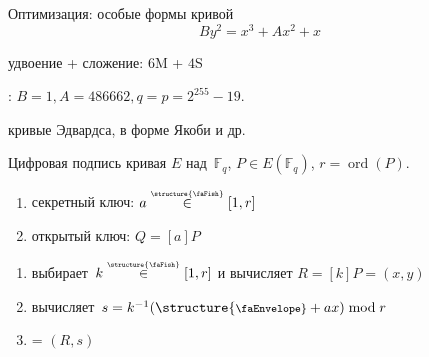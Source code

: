 \documentclass{beamer}
\begin{document}
	\begin{frame}{Оптимизация: особые формы кривой}
		\[
		B y^2 = x^3 + A x^2 + x
		\]
		\begin{center}
			\begin{tcolorbox}[enhanced,hbox,colback=box-blue-color!15,colframe=box-blue-color,title=Сложность,center title]
				\begin{varwidth}{\textwidth}
					удвоение + сложение: $6$M + $4$S
				\end{varwidth}
			\end{tcolorbox}	
		\end{center}
		: $B = 1, A = 486662, q=p=2^{255} - 19$.
		
		\vspace{0.5em}
		
		 кривые Эдвардса, в форме Якоби и др.
	\end{frame}
	
	
	\begin{frame}{Цифровая подпись}
		 кривая $E$ над~$\mathbb{F}_q$, $P \in E(\mathbb{F}_q)$, $r = \operatorname{ord}(P)$.
		
		
		\vspace{1em}
		
		
		\begin{enumerate}
			\item секретный ключ: $a \overset{\text{\tiny\structure{\faFish}}}{\in} [1, r]$
			\item открытый ключ: $Q = [a] P$
		\end{enumerate}
		
		\vspace{1em}
		
		\begin{enumerate}
			\item \structure{\faCat} выбирает~$k \overset{\text{\tiny\structure{\faFish}}}{\in} [1, r]$ и вычисляет $R = [k] P  = (x, y)$
			\item вычисляет~$s = k^{-1} (\text{\structure{\footnotesize\faEnvelope}} + a x) \bmod{r}$
			\item \structure{\faPaw} = $(R, s)$
		\end{enumerate}
	\end{frame}
	
\end{document}

